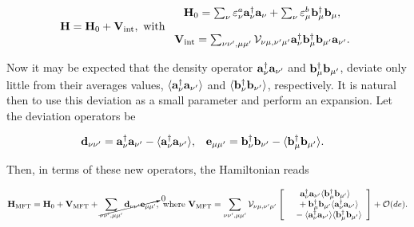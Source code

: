 \documentclass{homework}
\begin{document}
\begin{equation}
    {\bf H} = {\bf H}_0 + {\bf V}_{\textnormal{int}}, \textnormal{ with } \begin{array}{c}
         {\bf H}_0 = \sum_{\nu} \varepsilon_{\nu}^a {\bf a}_\nu^\dagger {\bf a}_\nu + \sum_{\nu} \varepsilon_{\mu}^b{\bf b}_\mu^\dagger {\bf b}_\mu,  \\
         \\
         {\bf V}_{\textnormal{int}}  = \sum_{\nu\nu', \mu\mu'} {\mathcal V}_{\nu\mu, \nu'\mu'} {\bf a}^\dagger_{\nu} {\bf b}_{\mu}^\dagger {\bf b}_{\mu'} {\bf a}_{\nu'}.
    \end{array}
\end{equation}

Now it may be expected that the density operator ${\bf a}_{\nu}^\dagger {\bf a}_{\nu'}$ and ${\bf b}_{\mu}^\dagger {\bf b}_{\mu'}$, deviate only little from their averages values, $ \langle {\bf a}_{\nu}^\dagger {\bf a}_{\nu'} \rangle$ and  $ \langle {\bf b}_{\nu}^\dagger {\bf b}_{\nu'} \rangle$, respectively. It is natural then to use this deviation as a small parameter and perform an expansion. Let the deviation operators be 

\begin{align}
    {\bf d}_{\nu \nu'} &= {\bf a}_{\nu}^\dagger {\bf a}_{\nu'} - \langle {\bf a}_{\nu}^\dagger {\bf a}_{\nu'} \rangle, & {\bf e}_{\mu \mu'} &= {\bf b}_{\nu}^\dagger {\bf b}_{\nu'} - \langle {\bf b}_{\mu}^\dagger {\bf b}_{\mu'} \rangle.
\end{align}

Then, in terms of these new operators, the Hamiltonian reads

\begin{equation*}
    {\bf H}_{\textnormal{MFT}}  = {\bf H}_0 + {\bf V}_{\textnormal{MFT}} + \cancelto{0}{\sum_{\nu\nu', \mu\mu'} {\bf d}_{\nu \nu'} {\bf e}_{\mu \mu'}}, \textnormal{ where } {\bf V}_{\textnormal{MFT}} = \sum_{\nu\nu', \mu\mu'} {\mathcal V}_{\nu\mu, \nu'\mu'} \left[\begin{array}{c}
         {\bf a}_{\nu}^\dagger {\bf a}_{\nu'} \langle {\bf b}_{\mu}^\dagger {\bf b}_{\mu'} \rangle \\
         \textnormal{ } \textnormal{ } + {\bf b}_{\mu}^\dagger {\bf b}_{\mu'} \langle {\bf a}_{\nu}^\dagger {\bf a}_{\nu'} \rangle \\
         \textnormal{ } \textnormal{ } - \langle {\bf a}_{\nu}^\dagger {\bf a}_{\nu'} \rangle \langle {\bf b}_{\mu}^\dagger {\bf b}_{\mu'} \rangle  
    \end{array} \right] + \mathcal{O}(d e).
\end{equation*}
\end{document}
